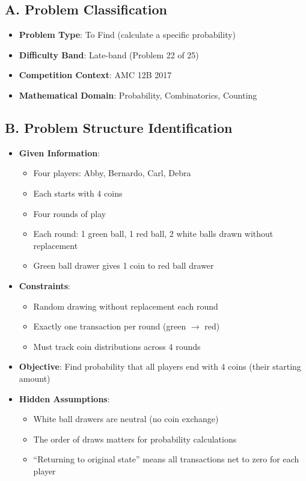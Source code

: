 \documentclass[]{article}
\begin{document}
\begin{problemconfigbox}
\subsection*{A. Problem Classification}
\begin{itemize}[leftmargin=*]
    \item \textbf{Problem Type}: To Find (calculate a specific probability)
    \item \textbf{Difficulty Band}: Late-band (Problem 22 of 25)
    \item \textbf{Competition Context}: AMC 12B 2017
    \item \textbf{Mathematical Domain}: Probability, Combinatorics, Counting
\end{itemize}

\subsection*{B. Problem Structure Identification}
\begin{itemize}[leftmargin=*]
    \item \textbf{Given Information}:
    \begin{itemize}
        \item Four players: Abby, Bernardo, Carl, Debra
        \item Each starts with 4 coins
        \item Four rounds of play
        \item Each round: 1 green ball, 1 red ball, 2 white balls drawn without replacement
        \item Green ball drawer gives 1 coin to red ball drawer
    \end{itemize}
    
    \item \textbf{Constraints}:
    \begin{itemize}
        \item Random drawing without replacement each round
        \item Exactly one transaction per round (green $\to$ red)
        \item Must track coin distributions across 4 rounds
    \end{itemize}
    
    \item \textbf{Objective}: Find probability that all players end with 4 coins (their starting amount)
    
    \item \textbf{Hidden Assumptions}:
    \begin{itemize}
        \item White ball drawers are neutral (no coin exchange)
        \item The order of draws matters for probability calculations
        \item ``Returning to original state'' means all transactions net to zero for each player
    \end{itemize}
    

\end{itemize}
\end{problemconfigbox}
\end{document}
